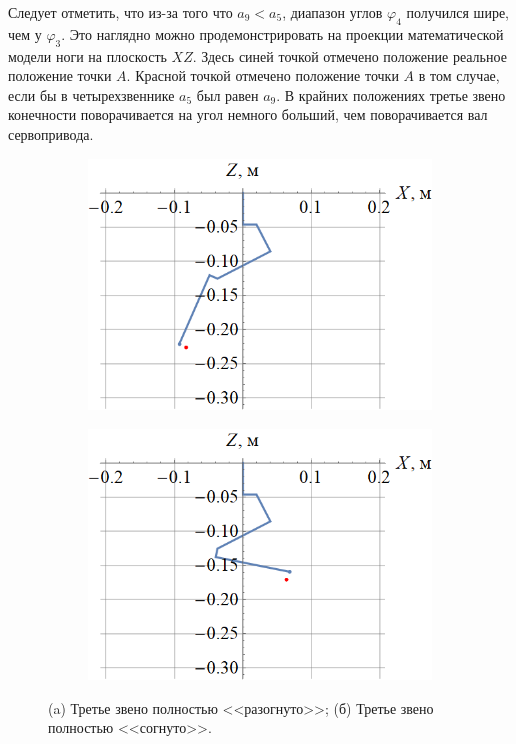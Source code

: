 Следует отметить, что из-за того что $ a_9 < a_5 $, диапазон углов $ \varphi_4 $ получился шире, чем у $ \varphi_3 $. Это наглядно можно продемонстрировать на проекции математической модели ноги на плоскость $ XZ $. Здесь синей точкой отмечено положение реальное положение точки $ A $. Красной точкой отмечено положение точки $ A $ в том случае, если бы в четырехзвеннике $ a_5 $ был равен $ a_9 $. В крайних положениях третье звено конечности поворачивается на угол немного больший, чем поворачивается вал сервопривода.
\begin{figure}[ht]
    \centering
    \begin{subfigure}[b]{0.45\textwidth}    
        \centering
        \includegraphics[scale=0.4]{chapter_kinematics/figure5.png}
        \caption{}
    \end{subfigure}
    \begin{subfigure}[b]{0.45\textwidth}
        \centering
        \includegraphics[scale=0.4]{chapter_kinematics/figure6.png}
        \caption{}
    \end{subfigure}
     
    \caption{(a) Третье звено полностью <<разогнуто>>; (б) Третье звено полностью <<согнуто>>.}
    \label{fig:leg_model}
\end{figure}

